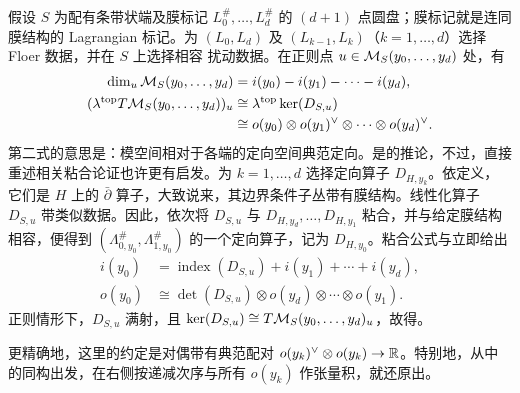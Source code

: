 假设 $S$ 为配有条带状端及膜标记 $L_0^\#,\allowbreak \ldots,\allowbreak L_d^\#$ 的 $(d+1)$ 点圆盘；膜标记就是连同膜结构的 Lagrangian 标记。为 $(L_0,\allowbreak L_d)$ 及 $(L_{k-1},\allowbreak L_k)$（$k=1,\allowbreak \ldots,\allowbreak d$）选择 Floer 数据，并在 $S$ 上选择相容
扰动数据。在正则点 $u\in\mathcal M_S(y_0,\allowbreak \ldots,\allowbreak y_d)$ 处，有
\begin{equation}\label{eq:12.2}
\begin{aligned}
\dim_u\mathcal M_S(y_0,\ldots,y_d)&=i(y_0)-i(y_1)-\cdots-i(y_d),\\
(\lambda^{\mathrm{top}}T\mathcal M_S(y_0,\ldots,y_d))_u
&\cong\lambda^{\mathrm{top}}\ker(D_{S,u})\\
&\cong o(y_0)\otimes o(y_1)^\vee\otimes\cdots\otimes o(y_d)^\vee.
\end{aligned}
\end{equation}
第二式的意思是：模空间相对于各端的定向空间典范定向。是的推论，不过，直接重述相关粘合论证也许更有启发。为 $k=1,\allowbreak \ldots,\allowbreak d$ 选择定向算子 $D_{H,\allowbreak y_k}$。依定义，它们是 $H$ 上的 $\bar\partial$ 算子，大致说来，其边界条件子丛带有膜结构。线性化算子 $D_{S,\allowbreak u}$ 带类似数据。因此，依次将 $D_{S,\allowbreak u}$ 与 $D_{H,\allowbreak y_d},\allowbreak \ldots,\allowbreak D_{H,\allowbreak y_1}$ 粘合，并与给定膜结构相容，便得到 $(\Lambda_{0,\allowbreak y_0}^\#,\allowbreak \Lambda_{1,\allowbreak y_0}^\#)$ 的一个定向算子，记为 $D_{H,\allowbreak y_0}$。粘合公式与立即给出
\begin{equation}\label{eq:12.3}
\begin{aligned}
i(y_0)&=\operatorname{index}(D_{S,u})+i(y_1)+\cdots+i(y_d),\\
o(y_0)&\cong\det(D_{S,u})\otimes o(y_d)\otimes\cdots\otimes o(y_1).
\end{aligned}
\end{equation}
正则情形下，$D_{S,\allowbreak u}$ 满射，且 $\ker(D_{S,\allowbreak u})\cong T\mathcal M_S(y_0,\allowbreak \ldots,\allowbreak y_d)_u$，故得。
\begin{note}\label{st:12.2}
更精确地，这里的约定是对偶带有典范配对 $o(y_k)^\vee\otimes o(y_k)\to\mathbb R$。特别地，从中的同构出发，在右侧按递减次序与所有 $o(y_k)$ 作张量积，就还原出。
\end{note}

